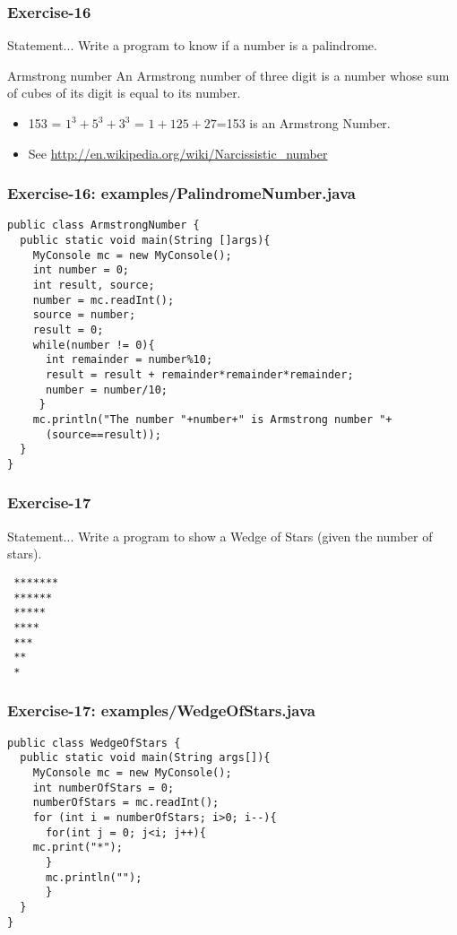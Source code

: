\documentclass[xcolor=dvipsnames,dvip,notes=show,table]{beamer}
\begin{document}
\begin{frame}[fragile]
\frametitle{Exercise-16}
\begin{block}{Statement...}
 Write a program to know if a number is a palindrome.
\end{block}

\begin{exampleblock}{Armstrong number}
 An Armstrong number of three digit is a number whose sum of cubes of its digit is equal to its number. 
  \begin{itemize}
   \item  153 = $1^3+5^3+3^3$ = $1+125+27$=153 is an Armstrong Number.
   \item  See \url{http://en.wikipedia.org/wiki/Narcissistic\_number}
  \end{itemize}

\end{exampleblock}


\end{frame}


\begin{frame}[fragile]
\frametitle{Exercise-16: examples/PalindromeNumber.java}
\scriptsize
\begin{lstlisting}
public class ArmstrongNumber {
  public static void main(String []args){
    MyConsole mc = new MyConsole();
    int number = 0;
    int result, source;
    number = mc.readInt();
    source = number;
    result = 0;
    while(number != 0){
      int remainder = number%10;
      result = result + remainder*remainder*remainder;
      number = number/10;
     }
    mc.println("The number "+number+" is Armstrong number "+
      (source==result));        
  }
}
\end{lstlisting}
\end{frame}


\begin{frame}[fragile]
\frametitle{Exercise-17}
\begin{block}{Statement...}
 Write a program to show a Wedge of Stars (given the number of stars).
\end{block}

\begin{lstlisting}
 *******
 ******
 *****
 ****
 ***
 **
 *
\end{lstlisting}



\end{frame}


\begin{frame}[fragile]
\frametitle{Exercise-17: examples/WedgeOfStars.java}
\scriptsize
\begin{lstlisting}
public class WedgeOfStars {
  public static void main(String args[]){
    MyConsole mc = new MyConsole();
    int numberOfStars = 0;
    numberOfStars = mc.readInt();
    for (int i = numberOfStars; i>0; i--){
      for(int j = 0; j<i; j++){
	mc.print("*");
      }
      mc.println("");
      }
  }
}
\end{lstlisting}
\end{frame}
\end{document}
